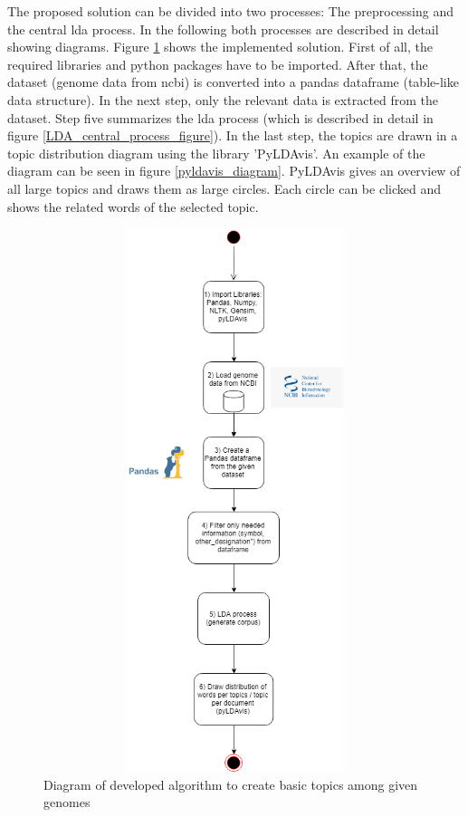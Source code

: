 The proposed solution can be divided into two processes: The preprocessing and the central \ac{lda} process. In the following both processes are described in detail showing diagrams.
Figure \ref{LDA_preprocess_figure} shows the implemented solution. First of all, the required libraries and python packages have to be imported. After that, the dataset (genome data from \ac{ncbi}) is converted into a pandas dataframe (table-like data structure). In the next step, only the relevant data is extracted from the dataset. Step five summarizes the \ac{lda} process (which is described in detail in figure \ref{LDA_central_process_figure}). In the last step, the topics are drawn in a topic distribution diagram using the library 'PyLDAvis'. An example of the diagram can be seen in figure \ref{pyldavis_diagram}. PyLDAvis gives an overview of all large topics and draws them as large circles. Each circle can be clicked and shows the related words of the selected topic.

\begin{figure}[htbp]
	\centering
	\includegraphics[width=1\textwidth, height=600px, keepaspectratio]{Image/LDA_preprocess.png}
	\caption{Diagram of developed algorithm to create basic topics among given genomes}
	\label{LDA_preprocess_figure}
\end{figure}

